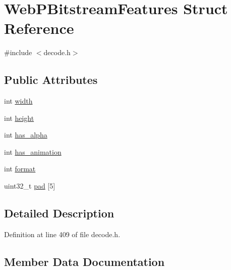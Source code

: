 \hypertarget{struct_web_p_bitstream_features}{}\section{Web\+P\+Bitstream\+Features Struct Reference}
\label{struct_web_p_bitstream_features}


{\ttfamily \#include $<$decode.\+h$>$}

\subsection*{Public Attributes}
\begin{DoxyCompactItemize}
\item 
int \mbox{\hyperlink{struct_web_p_bitstream_features_a2ca102ea828b5b58d03138e059890c5e}{width}}
\item 
int \mbox{\hyperlink{struct_web_p_bitstream_features_a4ee49132795b6676be92169299a25b8b}{height}}
\item 
int \mbox{\hyperlink{struct_web_p_bitstream_features_a2ec4519a9dfbc065e476b666f9007678}{has\+\_\+alpha}}
\item 
int \mbox{\hyperlink{struct_web_p_bitstream_features_a32f334eb42ab91a957b40786cfad1bfa}{has\+\_\+animation}}
\item 
int \mbox{\hyperlink{struct_web_p_bitstream_features_ac89999be3b50d8949fcf24f204848ffe}{format}}
\item 
uint32\+\_\+t \mbox{\hyperlink{struct_web_p_bitstream_features_aa59bdd4c454c2e2514cb97dbfe562ee7}{pad}} \mbox{[}5\mbox{]}
\end{DoxyCompactItemize}


\subsection{Detailed Description}


Definition at line 409 of file decode.\+h.



\subsection{Member Data Documentation}
\mbox{\label{struct_web_p_bitstream_features_ac89999be3b50d8949fcf24f204848ffe}} 
